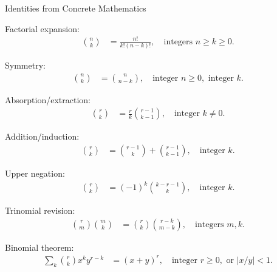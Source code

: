 Identities from Concrete Mathematics~\cite[p. 174]{graham1994concrete}
\begin{identity}
    Factorial expansion:
    \begin{align*}
        \binom{n}{k} &= \frac{n!}{k!(n-k)!}, \quad \text{integers } n \geq k \geq 0.
    \end{align*}
\end{identity}

\begin{identity}
    Symmetry:
    \begin{align*}
        \binom{n}{k} &= \binom{n}{n-k}, \quad \text{integer } n \geq 0, \text{ integer } k.
    \end{align*}
\end{identity}

\begin{identity}
    Absorption/extraction:
    \begin{align*}
        \binom{r}{k} &= \frac{r}{k} \binom{r-1}{k-1}, \quad \text{integer } k \neq 0.
    \end{align*}
\end{identity}

\begin{identity}
    Addition/induction:
    \begin{align*}
        \binom{r}{k} &= \binom{r-1}{k} + \binom{r-1}{k-1}, \quad \text{integer } k.
    \end{align*}
\end{identity}

\begin{identity}
    Upper negation:
    \begin{align*}
        \binom{r}{k} &= (-1)^k \binom{k - r - 1}{k}, \quad \text{integer } k.
    \end{align*}
\end{identity}

\begin{identity}
    Trinomial revision:
    \begin{align*}
        \binom{r}{m} \binom{m}{k} &= \binom{r}{k} \binom{r - k}{m - k}, \quad \text{integers } m, k.
    \end{align*}
\end{identity}

\begin{identity}
    Binomial theorem:
    \begin{align*}
        \sum_{k} \binom{r}{k} x^k y^{r-k} &= (x + y)^r, \quad \text{integer } r \geq 0, \text{ or } |x/y| < 1.
    \end{align*}
\end{identity}


